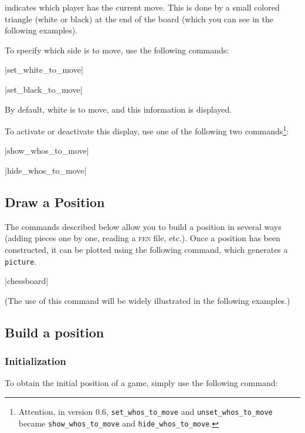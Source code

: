 \documentclass[english]{ltxdoc}
\begin{document}
\mpchess indicates which player has the current move. This is done by
a small colored triangle (white or black) at the end of the board (which
you can see in the following examples).

To specify which side is to move, use the following commands:

\commande|set_white_to_move|\smallskip


\commande|set_black_to_move|\smallskip

By default, white is to move, and this information is displayed.

To activate or deactivate this display, use one of the following two
commands\footnote{Attention,
in version 0.6, \lstinline+set_whos_to_move+ and
\lstinline+unset_whos_to_move+ became \lstinline+show_whos_to_move+ and
\lstinline+hide_whos_to_move+.}:

\commande|show_whos_to_move|\smallskip


\commande|hide_whos_to_move|\smallskip

\subsection{Draw a Position}

The commands described below allow you to build a position in several ways
(adding pieces one by one, reading a \textsc{fen} file, etc.). Once a position
has been constructed, it can be plotted 
using the following command, which generates a \MP{} \lstinline+picture+.


\commande|chessboard|\smallskip \label{com:chessboard}

(The use of this command will be widely illustrated in the following examples.)

\subsection{Build a position}

\subsubsection{Initialization}

To obtain the initial position of a game, simply use the following command:
\end{document}

